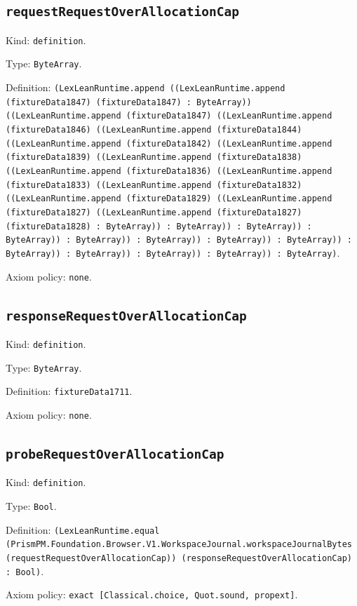 \documentclass[11pt]{article}
\begin{document}
\subsection*{\texttt{requestRequestOverAllocationCap}}
\noindent Kind: \texttt{definition}.\par
\noindent Type: \texttt{ByteArray}.\par
\noindent Definition: \texttt{(LexLeanRuntime.append ((LexLeanRuntime.append (fixtureData1847) (fixtureData1847) : ByteArray)) ((LexLeanRuntime.append (fixtureData1847) ((LexLeanRuntime.append (fixtureData1846) ((LexLeanRuntime.append (fixtureData1844) ((LexLeanRuntime.append (fixtureData1842) ((LexLeanRuntime.append (fixtureData1839) ((LexLeanRuntime.append (fixtureData1838) ((LexLeanRuntime.append (fixtureData1836) ((LexLeanRuntime.append (fixtureData1833) ((LexLeanRuntime.append (fixtureData1832) ((LexLeanRuntime.append (fixtureData1829) ((LexLeanRuntime.append (fixtureData1827) ((LexLeanRuntime.append (fixtureData1827) (fixtureData1828) : ByteArray)) : ByteArray)) : ByteArray)) : ByteArray)) : ByteArray)) : ByteArray)) : ByteArray)) : ByteArray)) : ByteArray)) : ByteArray)) : ByteArray)) : ByteArray)) : ByteArray)}.\par
\noindent Axiom policy: \texttt{none}.\par
\subsection*{\texttt{responseRequestOverAllocationCap}}
\noindent Kind: \texttt{definition}.\par
\noindent Type: \texttt{ByteArray}.\par
\noindent Definition: \texttt{fixtureData1711}.\par
\noindent Axiom policy: \texttt{none}.\par
\subsection*{\texttt{probeRequestOverAllocationCap}}
\noindent Kind: \texttt{definition}.\par
\noindent Type: \texttt{Bool}.\par
\noindent Definition: \texttt{(LexLeanRuntime.equal (PrismPM.Foundation.Browser.V1.WorkspaceJournal.workspaceJournalBytes (requestRequestOverAllocationCap)) (responseRequestOverAllocationCap) : Bool)}.\par
\noindent Axiom policy: \texttt{exact [Classical.choice, Quot.sound, propext]}.\par
\end{document}
